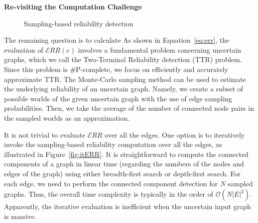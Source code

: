 \textbf{Re-visiting the Computation Challenge}~~
\begin{figure}
    \vspace{-10pt}
    \caption{Sampling-based reliability detection}
    \vspace{-5pt}
    \label{fig:computationERR}
\end{figure} 
The remaining question is to calculate
As shown in Equation~\ref{eq:err},  
the evaluation of $\mathcal{E}RR(e)$ involves a fundamental problem concerning uncertain graphs, which we call 
the Two-Terminal Reliability detection (TTR) problem. 
Since this problem is \#P-complete, we focus on efficiently and accurately approximate TTR.
The Monte-Carlo sampling method can be used to estimate the underlying reliability of an uncertain graph. 
Namely, we create a subset of possible worlds of the given uncertain graph with the use of edge sampling probabilities. 
Then, we take the average of the number of connected node pairs in the sampled worlds as an approximation. 
 
It is not trivial to evaluate $\mathcal{E}RR$ over all the edges. 
One option is to iteratively invoke the sampling-based reliability computation over all the edges, 
as illustrated in Figure~\ref{fig:itERR}. 
It is straightforward to compute the connected components of a graph in linear time (regarding the numbers of the nodes and edges of the graph) using either breadth-first search or depth-first search.
For each edge, we need to perform the connected component detection for $N$ sampled graphs.
Thus, the overall time complexity is typically in the order of $\mathcal{O}( N |E|^{2})$.
Apparently, the iterative evaluation is inefficient when the uncertain input graph is massive.

